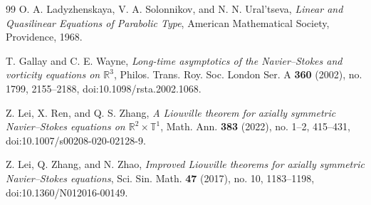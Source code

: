 \documentclass[11pt]{amsart}
\theoremstyle{plain}
\theoremstyle{definition}
\theoremstyle{remark}
\numberwithin{equation}{section}
\begin{document}
\begin{thebibliography}{99}
O. A. Ladyzhenskaya, V. A. Solonnikov, and N. N. Ural'tseva,
\emph{Linear and Quasilinear Equations of Parabolic Type},
American Mathematical Society, Providence, 1968.

T. Gallay and C. E. Wayne,
\emph{Long-time asymptotics of the Navier--Stokes and vorticity equations on
\(\mathbb R^3\)},
Philos. Trans. Roy. Soc. London Ser. A \textbf{360} (2002), no. 1799,
2155--2188, doi:10.1098/rsta.2002.1068.

Z. Lei, X. Ren, and Q. S. Zhang,
\emph{A Liouville theorem for axially symmetric Navier--Stokes equations on
\(\mathbb R^2\times\mathbb T^1\)},
Math. Ann. \textbf{383} (2022), no. 1--2, 415--431,
doi:10.1007/s00208-020-02128-9.

Z. Lei, Q. Zhang, and N. Zhao,
\emph{Improved Liouville theorems for axially symmetric Navier--Stokes
equations},
Sci. Sin. Math. \textbf{47} (2017), no. 10, 1183--1198,
doi:10.1360/N012016-00149.

\end{thebibliography}
\end{document}
